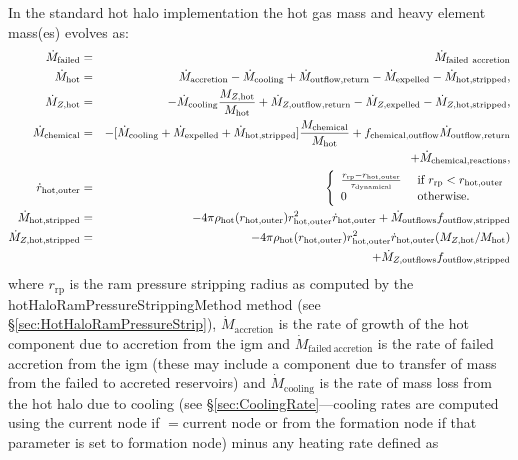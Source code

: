 In the standard hot halo implementation the hot gas mass and heavy element mass(es) evolves as:
\begin{eqnarray}
 \dot{M}_\mathrm{failed} &=& \dot{M}_\mathrm{failed~accretion} \\
 \dot{M}_\mathrm{hot} &=& \dot{M}_\mathrm{accretion} - \dot{M}_\mathrm{cooling} + \dot{M}_\mathrm{outflow,return} - \dot{M}_\mathrm{expelled} - \dot{M}_\mathrm{hot, stripped}, \\
 \dot{M}_{Z, \mathrm{hot}} &=& - \dot{M}_\mathrm{cooling} {M_{Z, \mathrm{hot}}\over M_\mathrm{hot}} + \dot{M}_{Z, \mathrm{outflow,return}} - \dot{M}_{Z,\mathrm{expelled}} - \dot{M}_{Z, \mathrm{hot, stripped}}, \\
 \dot{M}_\mathrm{chemical} &=& - [\dot{M}_\mathrm{cooling} + \dot{M}_\mathrm{expelled} + \dot{M}_\mathrm{hot, stripped}] {M_\mathrm{chemical}\over M_\mathrm{hot}} + f_\mathrm{chemical,outflow} \dot{M}_\mathrm{outflow,return} \nonumber \\ 
& & + \dot{M}_\mathrm{chemical,reactions}, \\
\dot{r}_\mathrm{hot, outer} &=& \left\{ \begin{array}{ll} {r_\mathrm{rp} - r_\mathrm{hot, outer} \over \tau_\mathrm{dynamical}} & \hbox{ if } r_\mathrm{rp} < r_\mathrm{hot, outer} \\ 0 & \hbox{ otherwise.} \end{array} \right. \\
\dot{M}_\mathrm{hot, stripped} &=& -4 \pi \rho_\mathrm{hot}(r_\mathrm{hot, outer}) r_\mathrm{hot, outer}^2 \dot{r}_\mathrm{hot, outer} + \dot{M}_\mathrm{outflows} f_\mathrm{outflow, stripped} \\
\dot{M}_{Z, \mathrm{hot, stripped}} &=& -4 \pi \rho_\mathrm{hot}(r_\mathrm{hot, outer}) r_\mathrm{hot, outer}^2 \dot{r}_\mathrm{hot, outer} (M_{Z, \mathrm{hot}} / M_\mathrm{hot}) \nonumber \\
 & & + \dot{M}_{Z, \mathrm{outflows}} f_\mathrm{outflow, stripped}  
\end{eqnarray}
where $r_\mathrm{rp}$ is the ram pressure stripping radius as computed by the {\normalfont \ttfamily hotHaloRamPressureStrippingMethod} method (see \S\ref{sec:HotHaloRamPressureStrip}), $\dot{M}_\mathrm{accretion}$ is the rate of growth of the hot \gls{component} due to accretion from the \gls{igm} and $\dot{M}_\mathrm{failed~accretion}$ is the rate of failed accretion from the \gls{igm} (these may include a \gls{component} due to transfer of mass from the failed to accreted reservoirs) and $\dot{M}_\mathrm{cooling}$ is the rate of mass loss from the hot halo due to cooling (see \S\ref{sec:CoolingRate}---cooling rates are computed using the current \gls{node} if {\normalfont \ttfamily [hotHaloCoolingFromNode]}$=${\normalfont \ttfamily current node} or from the formation \gls{node} if that parameter is set to {\normalfont \ttfamily formation node}) minus any heating rate defined as
